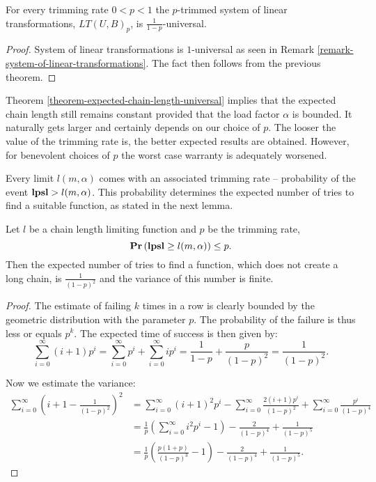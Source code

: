 \begin{corollary}
\label{corollary-trimming-linear}
For every trimming rate $0 < p < 1$ the $p$-trimmed system of linear transformations, $LT(U, B)_p$, is $\frac{1}{1 - p}$-universal.
\end{corollary}
\begin{proof}
System of linear transformations is $1$-universal as seen in Remark \ref{remark-system-of-linear-transformations}. The fact then follows from the previous theorem.
\end{proof}

Theorem \ref{theorem-expected-chain-length-universal} implies that the expected chain length still remains constant provided that the load factor $\alpha$ is bounded. It naturally gets larger and certainly depends on our choice of $p$. The looser the value of the trimming rate is, the better expected results are obtained. However, for benevolent choices of $p$ the worst case warranty is adequately worsened.

Every limit $l(m, \alpha)$ comes with an associated trimming rate -- probability of the event $\mathbf{lpsl} > l(m, \alpha)$. This probability determines the expected number of tries to find a suitable function, as stated in the next lemma.

\begin{lemma}
\label{lemma-linear-transformations-tries}
Let $l$ be a chain length limiting function and $p$ be the trimming rate, \[ \mathbf{Pr}\left(\mathbf{lpsl} \geq l(m, \alpha)\right) \leq p \text{.} \] Then the expected number of tries to find a function, which does not create a long chain, is $\frac{1}{(1 - p)^2}$ and the variance of this number is finite.
\end{lemma}
\begin{proof}
The estimate of failing $k$ times in a row is clearly bounded by the geometric distribution with  the parameter $p$. The probability of the failure is thus less or equals $p ^ k$. The expected time of success is then given by:
\[
\sum_{i = 0}^{\infty} (i + 1)p^i = \sum_{i = 0}^{\infty}p^i + \sum_{i = 0}^{\infty}ip^i = \frac{1}{1 - p} + \frac{p}{(1- p)^2} = \frac{1}{(1 - p)^2} \text{.}
\]

Now we estimate the variance:
\[
\begin{split}
\sum_{i = 0}^{\infty} \left(i + 1 - \frac{1}{(1 - p) ^ 2}\right) ^ 2  
	& = \sum_{i = 0}^{\infty} \left(i + 1\right) ^ 2 p ^ i - \sum_{i = 0}^{\infty} \frac{2(i + 1)p ^ i}{(1 - p) ^ 2} +   \sum_{i = 0}^{\infty} \frac{p ^ i}{(1 - p) ^ 4} \\
	& = \frac{1}{p}\left(\sum_{i = 0}^{\infty} i ^ 2 p ^ i - 1 \right) - \frac{2}{(1 - p) ^ 4} + \frac{1}{(1 - p) ^ 5} \\
	& = \frac{1}{p}\left(\frac{p(1 + p)}{(1 - p) ^ 3} - 1\right) - \frac{2}{(1 - p) ^ 4} + \frac{1}{(1 - p) ^ 5}
	\text{.}
\end{split}
\]
\end{proof}

